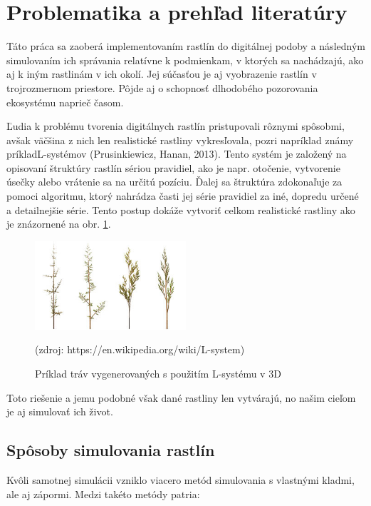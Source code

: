 \documentclass[12pt]{article}
\begin{document}
\section{Problematika a prehľad literatúry}

Táto práca sa zaoberá implementovaním rastlín do digitálnej podoby a následným
simulovaním ich správania relatívne k podmienkam, v ktorých sa nachádzajú,
ako aj k iným rastlinám v ich okolí. Jej súčasťou je aj vyobrazenie
rastlín v trojrozmernom priestore. Pôjde aj o schopnosť dlhodobého
pozorovania ekosystému naprieč časom.

Ľudia k problému tvorenia digitálnych rastlín pristupovali rôznymi spôsobmi,
avšak väčšina z nich len realistické rastliny vykresľovala, pozri napríklad
známy príklad\break L-systémov (Prusinkiewicz, Hanan, 2013). %
Tento systém je založený na opisovaní štruktúry rastlín
sériou pravidiel, ako je napr. otočenie, vytvorenie úsečky alebo
vrátenie sa na určitú pozíciu. Ďalej sa štruktúra zdokonaľuje za pomoci
algoritmu, ktorý nahrádza časti jej série pravidiel za iné, dopredu určené
a detailnejšie série. Tento postup dokáže vytvoriť celkom realistické rastliny
ako je znázornené na obr. \ref{obr:priklad l-systemu}.

\begin{figure}[ht]
	\centering
	\includegraphics[width=0.5\textwidth]{res/Fractal_weeds.png}
	\caption{Príklad tráv vygenerovaných s použitím L-systému v 3D}

	\footnotesize (zdroj: https://en.wikipedia.org/wiki/L-system)

	\label{obr:priklad l-systemu}
\end{figure}

Toto riešenie a jemu podobné však dané rastliny len vytvárajú, no našim cieľom
je aj simulovať ich život.


\subsection{Spôsoby simulovania rastlín}

Kvôli samotnej simulácii vzniklo viacero metód simulovania s vlastnými kladmi,
ale aj zápormi. Medzi takéto metódy patria:
\end{document}

